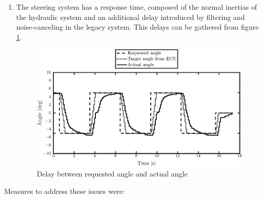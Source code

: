 \documentclass[root.tex]{subfiles}
\begin{document}
\begin{enumerate}
		\item The steering system has a response time, composed of the normal inertias of the hydraulic system and an additional delay introduced by filtering and noise-canceling in the legacy system. This delays can be gathered from figure \ref{fig:Step_input_request}.
		
		\begin{figure}[!h]
			
			\includegraphics[width=1\linewidth]{Step_input_request}
			\caption[Delay between requested and actual angle]{Delay between requested angle and actual angle}
			
			\label{fig:Step_input_request}
		\end{figure}
		
	\end{enumerate}
	
	
	Measures to address these issues were:
	
\end{document}
